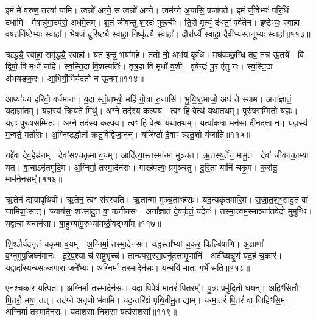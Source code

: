 इ॒मं मे॑ वरुण॒ तत्त्वा॑ यामि।
त्वन्नो॑ अग्ने॒ स त्वन्नो॑ अग्ने।
त्वम॑ग्ने अ॒यासि॒ प्रजा॑पते।
इ॒मं जी॒वेभ्यः॑ परि॒धिं द॑धामि।
मैषान्नु॑गा॒दप॑रो॒ अर्ध॑मे॒तम्।
श॒तं जी॑वन्तु श॒रदः॑ पुरू॒चीः।
ति॒रो मृ॒त्युं द॑धतां॒ पर्व॑तेन।
इ॒ष्टेभ्यः॒ स्वाहा॒ वष॒डनि॑ष्टेभ्यः॒ स्वाहा᳚।
भे॒ष॒जं दुरि॑ष्ट्यै॒ स्वाहा॒ निष्कृ॑त्यै॒ स्वाहा᳚।
दौरा᳚र्ध्यै॒ स्वाहा॒ दैवी᳚भ्यस्त॒नूभ्यः॒ स्वाहा᳚॥११३॥\ip

ऋद्ध्यै॒ स्वाहा॒ समृ॑द्ध्यै॒ स्वाहा᳚।
यत॑ इन्द्र॒ भया॑महे।
ततो॑ नो॒ अभ॑यं कृधि।
मघ॑वञ्छ॒ग्धि तव॒ तन्न॑ ऊ॒तये᳚।
वि द्विषो॒ वि मृधो॑ जहि।
स्व॒स्ति॒दा वि॒शस्पतिः॑।
वृ॒त्र॒हा वि मृधो॑ व॒शी।
वृषेन्द्रः॑ पु॒र ए॑तु नः।
स्व॒स्ति॒दा अ॑भयङ्क॒रः।
आ॒भिर्गी॒र्भिर्यदतो॑ न ऊ॒नम्॥११४॥\ip

आप्या॑यय हरिवो॒ वर्ध॑मानः।
य॒दा स्तो॒तृभ्यो॒ महि॑ गो॒त्रा रु॒जासि॑।
भू॒यि॒ष्ठ॒भाजो॒ अध॑ ते स्याम।
अना᳚ज्ञातं॒ यदाज्ञा॑तम्।
य॒ज्ञस्य॑ क्रि॒यते॒ मिथु॑।
अग्ने॒ तद॑स्य कल्पय।
त्वꣳ हि वेत्थ॑ यथात॒थम्।
पुरु॑षसम्मितो य॒ज्ञः।
य॒ज्ञः पुरु॑षसम्मितः।
अग्ने॒ तद॑स्य कल्पय।
त्वꣳ हि वेत्थ॑ यथात॒थम्।
यत्पा॑क॒त्रा मन॑सा दी॒नद॑क्षा॒ न।
य॒ज्ञस्य॑ म॒न्वते॒ मर्ता॑सः।
अ॒ग्निष्टद्धोता᳚ क्रतु॒विद्वि॑जा॒नन्।
यजि॑ष्ठो दे॒वाꣳ ऋ॑तु॒शो य॑जाति॥११५॥\ip\anuvakamend[दे॒वाꣴश्चि॒त्रं त॒नूभ्यः॒ स्वाहो॒नं पुरु॑षसम्मि॒तो\-ऽग्ने॒ तद॑स्य कल्पय॒ पञ्च॑ च]

यद्दे॑वा देव॒हेड॑नम्।
देवा॑सश्चकृ॒मा व॒यम्।
आदि॑त्या॒\-स्तस्मा᳚न्मा मुञ्चत।
ऋ॒तस्य॒र्तेन॒ मामु॒त।
देवा॑ जीवनका॒म्या यत्।
वा॒चा\-ऽनृ॑तमूदि॒म।
अ॒ग्निर्मा॒ तस्मा॒देन॑सः।
गार्‌\mbox{}ह॑पत्यः॒ प्रमु॑ञ्चतु।
दु॒रि॒ता यानि॑ चकृ॒म।
क॒रोतु॒ माम॑ने॒नसम्᳚॥११६॥\ip

ऋ॒तेन॑ द्यावापृथिवी।
ऋ॒तेन॒ त्वꣳ स॑रस्वति।
ऋ॒तान्मा॑ मुञ्च॒ताꣳह॑सः।
यद॒न्यकृ॑तमारि॒म।
स॒जा॒त॒श॒ꣳ॒सादु॒त वा॑ जामिश॒ꣳ॒सात्।
ज्याय॑सः॒ शꣳसा॑दु॒त वा॒ कनी॑यसः।
अना᳚ज्ञातं दे॒वकृ॑तं॒ यदेनः॑।
तस्मा॒त्त्वम॒स्माञ्जा॑तवेदो मुमुग्धि।
यद्वा॒चा यन्मन॑सा।
बा॒हुभ्या॑मू॒रुभ्या॑मष्ठी॒वद्भ्या᳚म्॥११७॥\ip

शि॒श्ञैर्यदनृ॑तं चकृ॒मा व॒यम्।
अ॒ग्निर्मा॒ तस्मा॒देन॑सः।
यद्धस्ता᳚भ्यां च॒कर॒ किल्बि॑षाणि।
अ॒क्षाणां᳚ व॒ग्नुमु॑प॒जिघ्न॑मानः।
दू॒रे॒प॒श्या च॑ राष्ट्र॒भृच्च॑।
तान्य॑फ्स॒रसा॒वनु॑दत्तामृ॒णानि॑।
अदी᳚व्यन्नृ॒णं यद॒हं च॒कार॑।
यद्वादा᳚स्यन्थ्सञ्ज॒गारा॒ जने᳚भ्यः।
अ॒ग्निर्मा॒ तस्मा॒देन॑सः।
यन्मयि॑ मा॒ता गर्भे॑ स॒ति॥११८॥\ip

एन॑श्च॒कार॒ यत्पि॒ता।
अ॒ग्निर्मा॒ तस्मा॒देन॑सः।
यदा॑ पि॒पेष॑ मा॒तरं॑ पि॒तरम्᳚।
पु॒त्रः प्रमु॑दितो॒ धयन्॑।
अहिꣳ॑सितौ पि॒तरौ॒ मया॒ तत्।
तद॑ग्ने अनृ॒णो भ॑वामि।
यद॒न्तरि॑क्षं पृथि॒वीमु॒त द्याम्।
यन्मा॒तरं॑ पि॒तरं॑ वा जिहिꣳसि॒म।
अ॒ग्निर्मा॒ तस्मा॒देन॑सः।
यदा॒शसा॑ नि॒शसा॒ यत्प॑रा॒शसा᳚॥११९॥\ip

